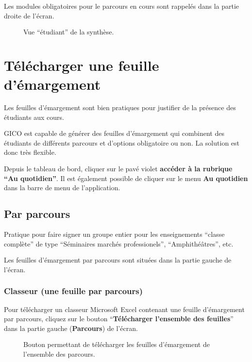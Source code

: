 \documentclass[letterpaper,10pt,french]{sphinxmanual}
\begin{document}
Les modules obligatoires pour le parcours en cours sont rappelés dans la partie droite de l'écran.
\begin{figure}[htbp]
\centering
\capstart

\caption{Vue ``étudiant'' de la synthèse.}\end{figure}


\section{Télécharger une feuille d'émargement}
\label{prof:telecharger-une-feuille-d-emargement}
Les feuilles d'émargement sont bien pratiques pour justifier de la présence des étudiants aux cours.

GICO est capable de générer des feuilles d'émargement qui combinent des étudiants de différents parcours et d'options obligatoire ou non. La solution est donc très flexible.

Depuis le tableau de bord, cliquer sur le pavé violet \textbf{accéder à la rubrique ``Au quotidien''}. Il est également possible de cliquer sur le menu \textbf{Au quotidien} dans la barre de menu de l'application.


\subsection{Par parcours}
\label{prof:par-parcours}
Pratique pour faire signer un groupe entier pour les enseignements ``classe complète'' de type ``Séminaires marchés professionels'', ``Amphithéâtres'', etc.

Les feuilles d'émargement par parcours sont situées dans la partie gauche de l'écran.


\subsubsection{Classeur (une feuille par parcours)}
\label{prof:classeur-une-feuille-par-parcours}
Pour télécharger un classeur Microsoft Excel contenant une feuille d'émargement par parcours, cliquez sur le bouton ``\textbf{Télécharger l'ensemble des feuilles}'' dans la partie gauche (\textbf{Parcours}) de l'écran.
\begin{figure}[htbp]
\centering
\capstart

\caption{Bouton permettant de télécharger les feuilles d'émargement de l'ensemble des parcours.}\end{figure}
\end{document}
